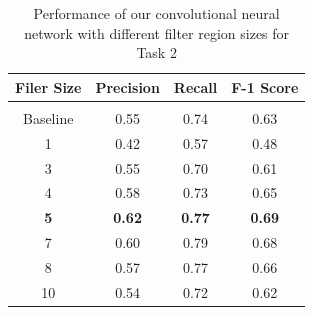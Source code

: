 \begin{table}[ht]
    \centering
    \caption{Performance of our convolutional neural network with different filter region sizes for Task 2}
    \begin{tabular}{c  c  c  c}
         \toprule
         \textbf{Filer Size}        &   \textbf{Precision}      &   \textbf{Recall}            &   \textbf{F-1 Score}      \\
         \midrule
         \\[-1em]
         
         Baseline                   &   0.55                    &            0.74                       &   0.63                    \\

         1                          &   0.42                    &             0.57                       &   0.48                    \\

         3                          &   0.55                    &             0.70                       &   0.61                    \\

         4                          &   0.58                    &             0.73                       &   0.65                    \\
         
         \textbf{5}                 &   \textbf{0.62}           &             \textbf{0.77}              &   \textbf{0.69}           \\
         
         7                          &   0.60                     &            0.79                       &   0.68                    \\
         
         8                          &   0.57                    &             0.77                       &   0.66                    \\
         
         10                         &   0.54                    &             0.72                       &   0.62                    \\
         
         \bottomrule
    \end{tabular}
    \label{table:task2-filter-size-results}
\end{table}

